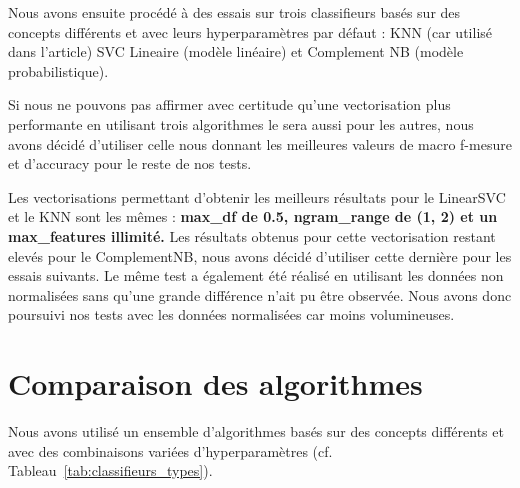 \documentclass[11pt]{article}
\begin{document}
Nous avons ensuite procédé à des essais sur trois classifieurs basés sur des concepts différents et avec leurs hyperparamètres par défaut : KNN (car utilisé dans l'article) SVC Lineaire (modèle linéaire) et Complement NB (modèle probabilistique).

Si nous ne pouvons pas affirmer avec certitude qu'une vectorisation plus performante en utilisant trois algorithmes le sera aussi pour les autres, nous avons décidé d'utiliser celle nous donnant les meilleures valeurs de macro f-mesure et d'accuracy pour le reste de nos tests.

\begin{table}[ht]
\centering
{}
\caption{Meilleurs résultats obtenus pour chaque algorithme.}
\label{tab:pourcentage_test}
\end{table}


Les vectorisations permettant d'obtenir les meilleurs résultats pour le LinearSVC et le KNN sont les mêmes : \textbf{max\_df de 0.5, ngram\_range de (1, 2) et un max\_features illimité.} Les résultats obtenus pour cette vectorisation restant elevés pour le ComplementNB, nous avons décidé d'utiliser cette dernière pour les essais suivants. Le même test a également été réalisé en utilisant les données non normalisées sans qu'une grande différence n'ait pu être observée. Nous avons donc poursuivi nos tests avec les données normalisées car moins volumineuses.

\section{Comparaison des algorithmes}
 Nous avons utilisé un ensemble d'algorithmes basés sur des concepts différents et avec des combinaisons variées d'hyperparamètres (cf. Tableau~\ref{tab:classifieurs_types}).
\end{document}
